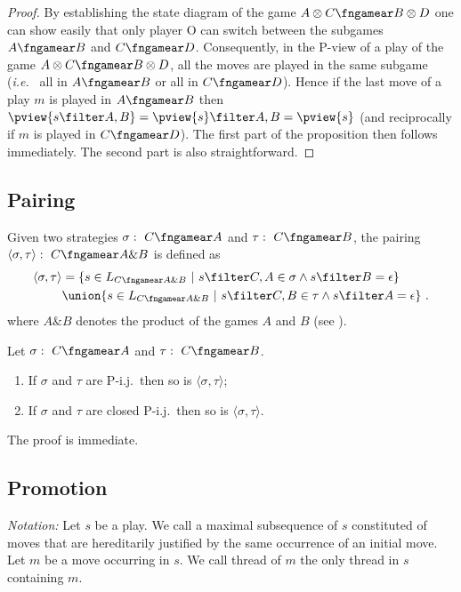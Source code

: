 \begin{proof}
By establishing the state diagram of the game $A\otimes C \fngamear
B\otimes D$ one can show easily that only player O can switch
between the subgames $A\fngamear B$ and $C\fngamear D$.
Consequently, in the P-view of a play of the game $A\otimes C
\fngamear B\otimes D$, all the moves are played in the same subgame
({\it i.e.~} all in $A\fngamear B$ or all in $C\fngamear D$). Hence
if the last move of a play $m$ is played in $A\fngamear B$ then
$\pview{s\filter A,B} = \pview{s} \filter A,B = \pview{s}$ (and
reciprocally if $m$ is played in $C\fngamear D$). The first part of
the proposition then follows immediately. The second part is also
straightforward.
\end{proof}


\subsection{Pairing} Given two strategies $\sigma :\ C \fngamear A$
and $\tau :\ C\fngamear B$, the pairing $\langle \sigma , \tau
\rangle :\ C \fngamear A\& B$ is defined as
\begin{align*}
\langle \sigma , \tau \rangle
    &= \{ s \in L_{C \fngamear A\& B} \ | \ s \filter C,A \in \sigma \wedge s \filter B = \epsilon \} \\
    & \union \{ s \in L_{C \fngamear A\& B} \ | \ s \filter C,B \in \tau \wedge s \filter A = \epsilon \}
\ .
\end{align*}
 where $A\& B$ denotes the product of the games $A$ and $B$ (see \cite{abramsky:game-semantics-tutorial}).

\begin{proposition}
\label{prop:pij_paring} Let $\sigma :\ C \fngamear A$  and $\tau :\
C\fngamear B$.
\begin{enumerate}
\item If $\sigma$ and $\tau$ are P-i.j.\ then so is $\langle \sigma , \tau \rangle$;
\item If $\sigma$ and $\tau$ are closed P-i.j.\ then so is $\langle \sigma , \tau \rangle$.
\end{enumerate}
\end{proposition}
The proof is immediate.


\subsection{Promotion} \emph{Notation:} Let $s$ be a play. We call
\defname{thread} a maximal subsequence of $s$ constituted of moves
that are hereditarily justified by the same occurrence of an initial
move. Let $m$ be a move occurring in $s$. We call thread of $m$ the
only thread in $s$ containing $m$.


